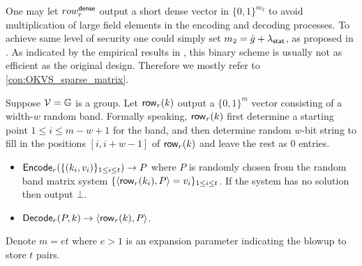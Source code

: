 
One may let $row_r^{\sf dense}$ output a short dense vector in $\{0,1\}^{m_2}$ to avoid multiplication of large field elements in the encoding and decoding processes. To achieve same level of security one could simply set $m_2=\hat{g}+\lambda_{\sf stat}$, as proposed in \cite{cryptoeprint:2021/883,cryptoeprint:2022/320}. As indicated by the empirical results in \cite{cryptoeprint:2022/320}, this binary scheme is usually not as efficient as the original design. Therefore we mostly refer to \cref{con:OKVS_sparse_matrix}. 

\begin{construction}\label{con:OKVS_ribbon}
  Suppose $\mathcal{V} = \mathbb{G}$ is a group. Let ${\sf row}_r(k)$ output a $\{0,1\}^m$ vector consisting of a width-$w$ random band. Formally speaking, ${\sf row}_r(k)$ first determine a starting point $1\le i\le m-w+1$ for the band, and then determine random $w$-bit string to fill in the positions $[i,i+w-1]$ of ${\sf row}_r(k)$ and leave the rest as 0 entries. 
  \begin{itemize}
    \item ${\sf Encode}_r(\{(k_i,v_i)\}_{1\le i\le t})\rightarrow P$ where $P$ is randomly chosen from the random band matrix system $\{\langle {\sf row}_r(k_i), P \rangle=v_i\}_{1\le i\le t}$. If the system has no solution then output $\bot$. 
    \item ${\sf Decode}_r(P,k)\rightarrow \langle {\sf row}_r(k), P \rangle$. 
  \end{itemize}
  Denote $m=et$ where $e>1$ is an expansion parameter indicating the blowup to store $t$ pairs. 
\end{construction}

